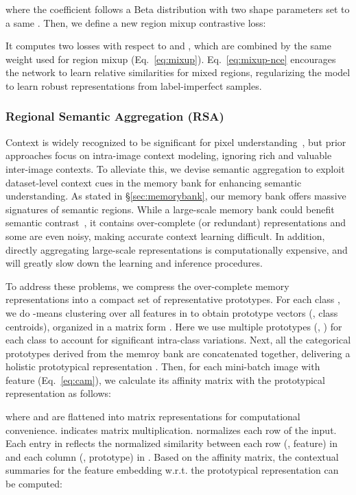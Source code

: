 \documentclass[10pt,twocolumn,letterpaper]{article}
\begin{document}
where the coefficient  follows a Beta distribution  with two shape parameters set to a same  \cite{zhang2018mixup}. Then, we define a new region mixup contrastive loss:

It computes two  losses with respect to  and , which are  combined  by the same weight  used for region mixup (Eq.~\ref{eq:mixup}). Eq.~\ref{eq:mixup-nce} encourages the network to learn relative similarities for mixed regions, regularizing the model to learn robust representations from label-imperfect samples.



\subsubsection{Regional Semantic Aggregation (RSA)}\label{sec:rsa}

Context is widely recognized to be significant for pixel understanding~\cite{zhang2018context,yuan2020object,jin2021mining}, but prior approaches focus on intra-image context modeling, ignoring rich and valuable inter-image contexts. To alleviate this, we devise semantic aggregation to exploit dataset-level context cues in the memory bank for enhancing semantic understanding.  As stated in \S\ref{sec:memorybank}, our memory bank offers massive  signatures of semantic regions. While a large-scale memory bank could benefit semantic contrast~\cite{he2020momentum}, it contains over-complete (or redundant) representations and some are even noisy, making accurate context learning difficult. In addition, directly aggregating large-scale representations is computationally expensive, and  will greatly slow down the learning and inference procedures. 

To address these problems, we  compress the over-complete memory representations into a compact set of representative prototypes. For each class , we do -means clustering over all features  in  to obtain  prototype vectors (\ie, class centroids), organized in a matrix form  .  Here we use multiple prototypes (\ie, ) for each class to account for significant intra-class variations.
Next, all the categorical prototypes derived from the memroy bank  are concatenated together, delivering a holistic prototypical representation . Then, for each mini-batch image  with feature  (Eq.~\ref{eq:cam}), {we  calculate its affinity matrix  with the prototypical representation  as follows:}

where  and  are flattened into matrix representations for computational convenience.  indicates  matrix multiplication.  normalizes each row of the input.  Each entry in  reflects the normalized similarity between each row (\ie, feature) in  and each column (\ie, prototype) in . Based on the affinity matrix,  the contextual summaries for the feature embedding  {w.r.t.}  the prototypical representation  can be computed:
\end{document}
